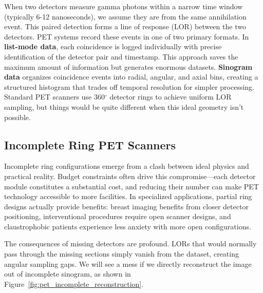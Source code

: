 \documentclass[12pt]{iopart}
\begin{document}
When two detectors measure gamma photons within a narrow time window (typically 6-12 nanoseconds), we assume they are from the same annihilation event. This paired detection forms a line of response (LOR) between the two detectors.
PET systems record these events in one of two primary formats. In \textbf{list-mode data}, each coincidence is logged individually with precise identification of the detector pair and timestamp. This approach saves the maximum amount of information but generates enormous datasets. \textbf{Sinogram data} organizes coincidence events into radial, angular, and axial bins, creating a structured histogram that trades off temporal resolution for simpler processing. Standard PET scanners use 360$^\circ$ detector rings to achieve uniform LOR sampling, but things would be quite different when this ideal geometry isn't possible.



\subsection{Incomplete Ring PET Scanners}



Incomplete ring configurations emerge from a clash between ideal physics and practical reality. Budget constraints often drive this compromise—each detector module constitutes a substantial cost, and reducing their number can make PET technology accessible to more facilities. In specialized applications, partial ring designs actually provide benefits: breast imaging benefits from closer detector positioning, interventional procedures require open scanner designs, and claustrophobic patients experience less anxiety with more open configurations.





The consequences of missing detectors are profound. 
LORs that would normally pass through the missing sections simply vanish from the dataset, creating angular sampling gaps. We will see a mess if we directly reconstruct the image out of incomplete sinogram, as shown in Figure~\ref{fig:pet_incomplete_reconstruction}.
\end{document}
